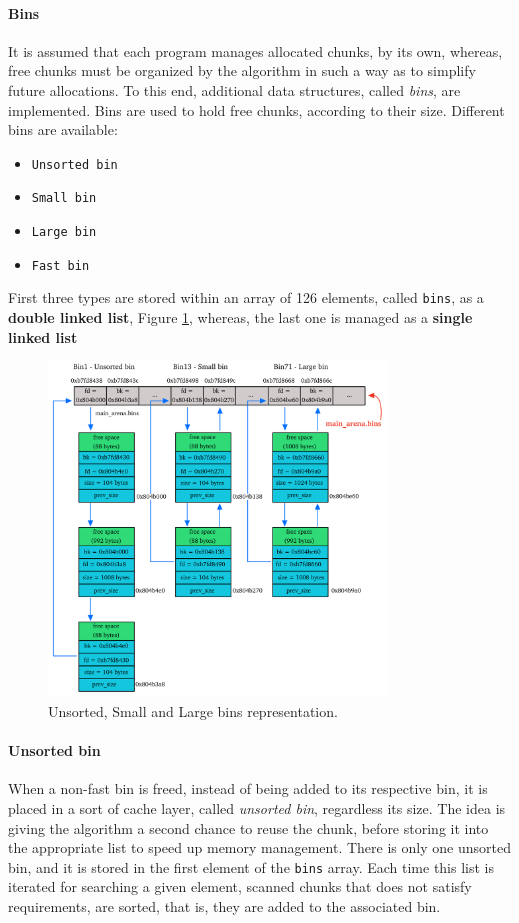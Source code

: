\documentclass{article}
\numberwithin{equation}{subsection}
\begin{document}
\paragraph{Bins}
 It is assumed that each program manages allocated chunks, by its own, whereas, free chunks must be organized by the algorithm in such a way as to simplify future allocations.
To this end, additional data structures, called \emph{bins}, are implemented. Bins are used to hold free chunks, according to their size. Different bins are available:
\begin{itemize}
    \item \texttt{Unsorted bin}
    \item \texttt{Small bin}
    \item \texttt{Large bin}
    \item \texttt{Fast bin}
\end{itemize}
First three types are stored within an array of 126 elements, called \texttt{bins}, as a  \textbf{double linked list}, Figure \ref{fig:bins}, whereas, the last one is managed as a \textbf{single linked list}
\begin{figure}[htb]
    \centering
    \includegraphics[width=0.8\textwidth]{main_arena_bins.pdf}
    \caption{Unsorted, Small and Large bins representation.}
    \label{fig:bins}
\end{figure}

\paragraph{Unsorted bin}
When a non-fast bin is freed, instead of being added to its respective bin, it is placed in a sort of cache layer, called \emph{unsorted bin}, regardless its size. The idea is giving the algorithm a second chance to reuse the chunk, before storing it into the appropriate list to speed up memory management. There is only one unsorted bin, and it is stored in the first element of the \texttt{bins} array. Each time this list is iterated for searching a given element, scanned chunks that does not satisfy requirements, are sorted, that is, they are added to the associated bin.
\end{document}
